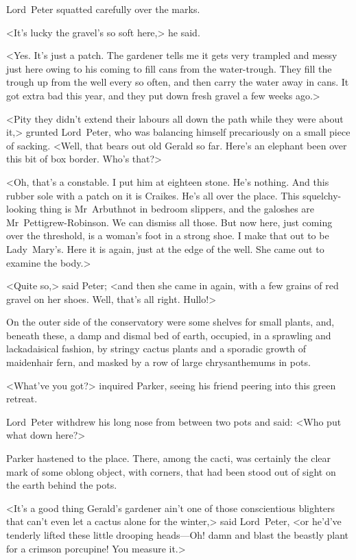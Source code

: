 Lord~Peter squatted carefully over the marks.

<It's lucky the gravel's so soft here,> he said.

<Yes. It's just a patch. The gardener tells me it gets very trampled and messy just here owing to his coming to fill cans from the water-trough. They fill the trough up from the well every so often, and then carry the water away in cans. It got extra bad this year, and they put down fresh gravel a few weeks ago.>

<Pity they didn't extend their labours all down the path while they were about it,> grunted Lord~Peter, who was balancing himself precariously on a small piece of sacking. <Well, that bears out old Gerald so far. Here's an elephant been over this bit of box border. Who's that?>

<Oh, that's a constable. I put him at eighteen stone. He's nothing. And this rubber sole with a patch on it is Craikes. He's all over the place. This squelchy-looking thing is Mr~Arbuthnot in bedroom slippers, and the galoshes are Mr~Pettigrew-Robinson. We can dismiss all those. But now here, just coming over the threshold, is a woman's foot in a strong shoe. I make that out to be Lady~Mary's. Here it is again, just at the edge of the well. She came out to examine the body.>

<Quite so,> said Peter; <and then she came in again, with a few grains of red gravel on her shoes. Well, that's all right. Hullo!>

On the outer side of the conservatory were some shelves for small plants, and, beneath these, a damp and dismal bed of earth, occupied, in a sprawling and lackadaisical fashion, by stringy cactus plants and a sporadic growth of maidenhair fern, and masked by a row of large chrysanthemums in pots.

<What've you got?> inquired Parker, seeing his friend peering into this green retreat.

Lord~Peter withdrew his long nose from between two pots and said: <Who put what down here?>

Parker hastened to the place. There, among the cacti, was certainly the clear mark of some oblong object, with corners, that had been stood out of sight on the earth behind the pots.

<It's a good thing Gerald's gardener ain't one of those conscientious blighters that can't even let a cactus alone for the winter,> said Lord~Peter, <or he'd've tenderly lifted these little drooping heads—Oh! damn and blast the beastly plant for a crimson porcupine! You measure it.>

